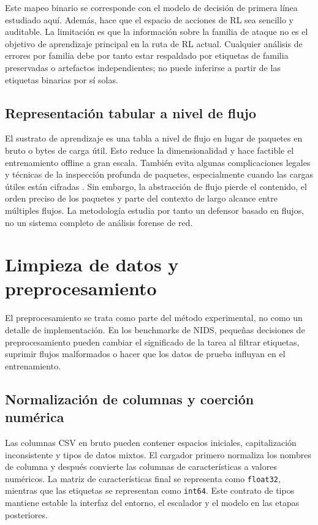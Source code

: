 Este mapeo binario se corresponde con el modelo de decisión de primera línea estudiado aquí. Además, hace que el espacio de acciones de RL sea sencillo y auditable. La limitación es que la información sobre la familia de ataque no es el objetivo de aprendizaje principal en la ruta de RL actual. Cualquier análisis de errores por familia debe por tanto estar respaldado por etiquetas de familia preservadas o artefactos independientes; no puede inferirse a partir de las etiquetas binarias por sí solas.

\subsection{Representación tabular a nivel de flujo}
El sustrato de aprendizaje es una tabla a nivel de flujo en lugar de paquetes en bruto o bytes de carga útil. Esto reduce la dimensionalidad y hace factible el entrenamiento offline a gran escala. También evita algunas complicaciones legales y técnicas de la inspección profunda de paquetes, especialmente cuando las cargas útiles están cifradas \parencite{Sperotto2010FlowIDS,Umer2017FlowIDS}. Sin embargo, la abstracción de flujo pierde el contenido, el orden preciso de los paquetes y parte del contexto de largo alcance entre múltiples flujos. La metodología estudia por tanto un defensor basado en flujos, no un sistema completo de análisis forense de red.

\section{Limpieza de datos y preprocesamiento}
El preprocesamiento se trata como parte del método experimental, no como un detalle de implementación. En los benchmarks de NIDS, pequeñas decisiones de preprocesamiento pueden cambiar el significado de la tarea al filtrar etiquetas, suprimir flujos malformados o hacer que los datos de prueba influyan en el entrenamiento.

\subsection{Normalización de columnas y coerción numérica}
Las columnas CSV en bruto pueden contener espacios iniciales, capitalización inconsistente y tipos de datos mixtos. El cargador primero normaliza los nombres de columna y después convierte las columnas de características a valores numéricos. La matriz de características final se representa como \texttt{float32}, mientras que las etiquetas se representan como \texttt{int64}. Este contrato de tipos mantiene estable la interfaz del entorno, el escalador y el modelo en las etapas posteriores.

